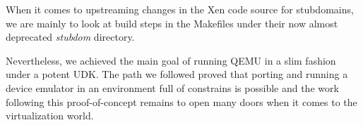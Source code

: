 When it comes to upstreaming changes in the Xen code source for stubdomains, we are mainly to look at build steps in the Makefiles under their now almost deprecated \textit{stubdom} directory.

Nevertheless, we achieved the main goal of running QEMU in a slim fashion under a potent UDK.
The path we followed proved that porting and running a device emulator in an environment full of constrains is possible and the work following this proof-of-concept remains to open many doors when it comes to the virtualization world.
